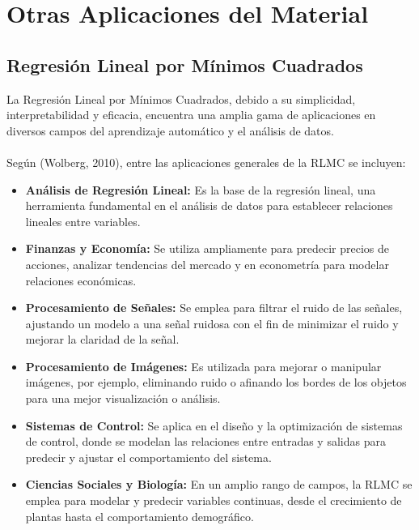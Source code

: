 \documentclass[]{article}
\begin{document}
	\section{Otras Aplicaciones del Material}
	\subsection{Regresión Lineal por Mínimos Cuadrados}
	La Regresión Lineal por Mínimos Cuadrados, debido a su simplicidad, interpretabilidad y eficacia, encuentra una amplia gama de aplicaciones en diversos campos del aprendizaje automático y el análisis de datos.\\
	\\
	Según (Wolberg, 2010), entre las aplicaciones generales de la RLMC se incluyen:\\
		
	\begin{itemize}
		\item \textbf{Análisis de Regresión Lineal:} Es la base de la regresión lineal, una herramienta fundamental en el análisis de datos para establecer relaciones lineales entre variables.
		\item \textbf{Finanzas y Economía:} Se utiliza ampliamente para predecir precios de acciones, analizar tendencias del mercado y en econometría para modelar relaciones económicas.
		\item \textbf{Procesamiento de Señales:} Se emplea para filtrar el ruido de las señales, ajustando un modelo a una señal ruidosa con el fin de minimizar el ruido y mejorar la claridad de la señal.
		\item \textbf{Procesamiento de Imágenes:} Es utilizada para mejorar o manipular imágenes, por ejemplo, eliminando ruido o afinando los bordes de los objetos para una mejor visualización o análisis.
		\item \textbf{Sistemas de Control:} Se aplica en el diseño y la optimización de sistemas de control, donde se modelan las relaciones entre entradas y salidas para predecir y ajustar el comportamiento del sistema.
		\item \textbf{Ciencias Sociales y Biología:} En un amplio rango de campos, la RLMC se emplea para modelar y predecir variables continuas, desde el crecimiento de plantas hasta el comportamiento demográfico.
	\end{itemize}
	
\end{document}
